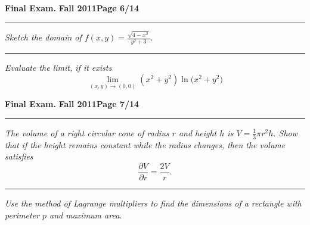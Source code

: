 \documentclass[12pt]{article}
\begin{document}
\newpage

\hfill{\large\bf Final Exam.}\hfill{\large\bf
  Fall 2011}\hfill{\large\bf Page 6/14}\hrule

\bigskip
{\problem[15 pts] \em  Sketch the domain of $f(x,y)=\displaystyle{\frac{\sqrt{4-x^2}}{y^2+3}}$.}
\vspace{11.5cm}
\hrule
{\problem[15 pts] \em Evaluate the limit, if it exists}
\begin{equation*}
\lim_{(x,y) \to (0,0)} (x^2+y^2) \ln \big( x^2 + y^2 \big)
\end{equation*}
\vspace{6.5cm}
\begin{flushright}
\end{flushright}
\newpage

\hfill{\large\bf Final Exam.}\hfill{\large\bf
  Fall 2011}\hfill{\large\bf Page 7/14}\hrule

\bigskip
{\problem[15 pts] \em The volume of a right circular cone of radius $r$ and height $h$ is $V = \tfrac{1}{3}\pi r^2h$.  Show that if the height remains constant while the radius changes, then the volume satisfies}
\begin{equation*}
\frac{\partial V}{\partial r} = \frac{2V}{r}.
\end{equation*}
\vspace{10.5cm}
\hrule
{\problem[10 pts] \em Use the method of Lagrange multipliers to find the
dimensions of a rectangle with perimeter $p$ and maximum area.}
\vspace{4.5cm}
\begin{flushright}
\end{flushright}
\newpage
\end{document}

